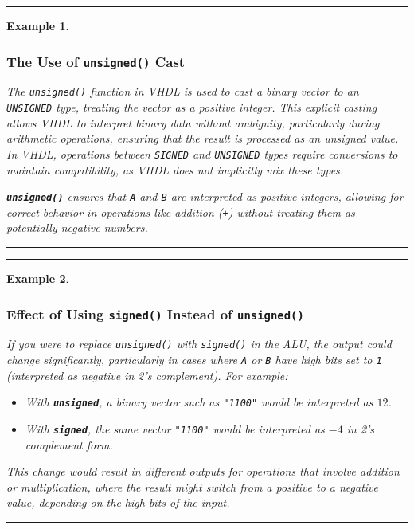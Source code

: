 \documentclass[12pt]{article}
\newtheorem{example}{Example}
\newenvironment{examp}
{
	\vspace{.5cm}
	\hrule
\begin{example}\upshape}
	{\hrule
		\vspace{0.5cm}
\end{example}}
\begin{document}
\begin{examp}
	\vspace{.5mm}
	\subsubsection*{The Use of \texttt{unsigned()} Cast}
	The \texttt{unsigned()} function in VHDL is used to cast a binary vector to an \texttt{UNSIGNED} type, treating the vector as a positive integer. This explicit casting allows VHDL to interpret binary data without ambiguity, particularly during arithmetic operations, ensuring that the result is processed as an unsigned value. In VHDL, operations between \texttt{SIGNED} and \texttt{UNSIGNED} types require conversions to maintain compatibility, as VHDL does not implicitly mix these types.

	\textbf{\texttt{unsigned()}} ensures that \texttt{A} and \texttt{B} are interpreted as positive integers, allowing for correct behavior in operations like addition (\texttt{+}) without treating them as potentially negative numbers.

\end{examp}
\begin{examp}
	\subsubsection*{Effect of Using \texttt{signed()} Instead of \texttt{unsigned()}}

	If you were to replace \texttt{unsigned()} with \texttt{signed()} in the ALU, the output could change significantly, particularly in cases where \texttt{A} or \texttt{B} have high bits set to \texttt{1} (interpreted as negative in 2’s complement). For example:
	\begin{itemize}
		\item With \textbf{\texttt{unsigned}}, a binary vector such as \texttt{"1100"} would be interpreted as \(12\).
		\item With \textbf{\texttt{signed}}, the same vector \texttt{"1100"} would be interpreted as \(-4\) in 2's complement form.
	\end{itemize}


	This change would result in different outputs for operations that involve addition or multiplication, where the result might switch from a positive to a negative value, depending on the high bits of the input.
\end{examp}
\end{document}
